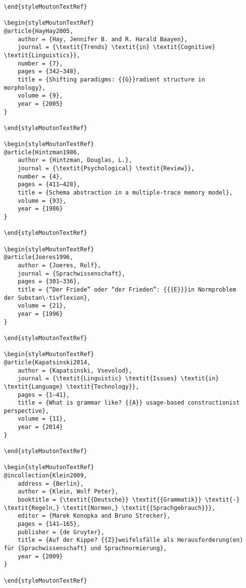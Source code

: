 \begin{styleMoutonHeadingi}
\begin{verbatim}
\end{styleMoutonTextRef}

\begin{styleMoutonTextRef}
@article{HayHay2005,
	author = {Hay, Jennifer B. and R. Harald Baayen},
	journal = {\textit{Trends} \textit{in} \textit{Cognitive} \textit{Linguistics}},
	number = {7},
	pages = {342–348},
	title = {Shifting paradigms: {{G}}radient structure in morphology},
	volume = {9},
	year = {2005}
}

\end{styleMoutonTextRef}

\begin{styleMoutonTextRef}
@article{Hintzman1986,
	author = {Hintzman, Douglas, L.},
	journal = {\textit{Psychological} \textit{Review}},
	number = {4},
	pages = {411–428},
	title = {Schema abstraction in a multiple-trace memory model},
	volume = {93},
	year = {1986}
}

\end{styleMoutonTextRef}

\begin{styleMoutonTextRef}
@article{Joeres1996,
	author = {Joeres, Rolf},
	journal = {Sprachwissenschaft},
	pages = {301–336},
	title = {“Der Friede” oder “der Frieden”: {{{E}}}in Normproblem der Substan\-tivflexion},
	volume = {21},
	year = {1996}
}

\end{styleMoutonTextRef}

\begin{styleMoutonTextRef}
@article{Kapatsinski2014,
	author = {Kapatsinski, Vsevolod},
	journal = {\textit{Linguistic} \textit{Issues} \textit{in} \textit{Language} \textit{Technology}},
	pages = {1–41},
	title = {What is grammar like? {{A}} usage-based constructionist perspective},
	volume = {11},
	year = {2014}
}

\end{styleMoutonTextRef}

\begin{styleMoutonTextRef}
@incollection{Klein2009,
	address = {Berlin},
	author = {Klein, Wolf Peter},
	booktitle = {\textit{{Deutsche}} \textit{{Grammatik}} \textit{-} \textit{Regeln,} \textit{Normen,} \textit{{Sprachgebrauch}}},
	editor = {Marek Konopka and Bruno Strecker},
	pages = {141–165},
	publisher = {de Gruyter},
	title = {Auf der Kippe? {{Z}}weifelsfälle als Herausforderung(en) für {Sprachwissenschaft} und Sprachnormierung},
	year = {2009}
}

\end{styleMoutonTextRef}


\end{verbatim}
\end{styleMoutonHeadingi}
